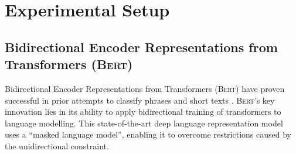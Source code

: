 \documentclass[11pt]{article}
\begin{document}




\section{Experimental Setup} %
\label{methodology}


\subsection{Bidirectional Encoder Representations from Transformers (\textsc{Bert})}

Bidirectional Encoder Representations from Transformers (\textsc{Bert}) have proven successful in prior attempts to classify phrases and short texts \cite{devlin2018bert} .
\textsc{Bert}'s key innovation lies in its ability to apply bidirectional training of transformers to language modelling. This state-of-the-art deep language representation model uses a ``masked language model'', enabling it to overcome restrictions caused by the unidirectional constraint.
\end{document}
